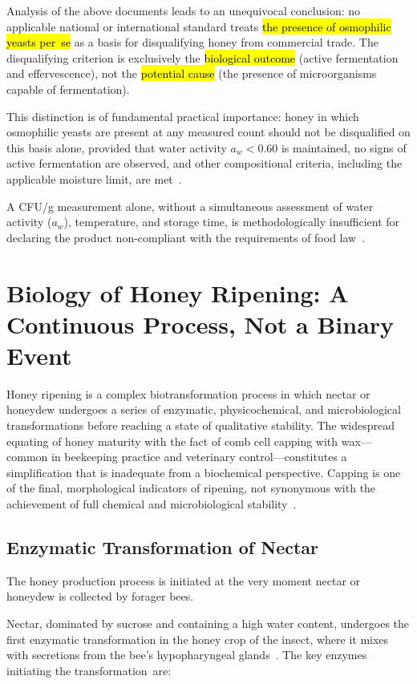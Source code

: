 \documentclass[foods,review,accept,pdftex,moreauthors]{Definitions/mdpi}
\begin{document}
Analysis of the above documents leads to an unequivocal conclusion:
no applicable national or international standard treats \hl{the
presence of osmophilic yeasts per~se} as a basis for disqualifying
honey from commercial trade. The disqualifying criterion is exclusively
the \hl{biological outcome} (active fermentation and effervescence),
not the \hl{potential cause} (the presence of microorganisms capable
of fermentation). 

{This distinction is of fundamental practical importance: honey in which osmophilic yeasts are present at any measured count should not be disqualified on this basis alone, provided that water activity $a_w < 0.60$ is maintained, no signs of active fermentation are observed, and other compositional criteria, including the applicable moisture limit, are met}~\cite{codex_stan12,eudir2001110}.

A CFU/g measurement alone, without a simultaneous assessment of water
activity ($a_w$), temperature, and storage time, is methodologically
insufficient for declaring the product non-compliant with the
requirements of food law~\cite{tsagkaris2021,schoder2026}.






\section{Biology of Honey Ripening: A Continuous Process, Not a Binary Event}

Honey ripening is a complex biotransformation process in which
nectar or honeydew undergoes a series of enzymatic, physicochemical,
and microbiological transformations before reaching a state of
qualitative stability. The widespread equating of honey maturity
with the fact of comb cell capping with wax---common in beekeeping
practice and veterinary control---constitutes a simplification that
is inadequate from a biochemical perspective. Capping is one of the
final, morphological indicators of ripening, not synonymous with the
achievement of full chemical and microbiological
stability~\cite{zhang2021,sun2021}.

\subsection{Enzymatic Transformation of Nectar}
The honey production process is initiated at the very moment nectar
or honeydew is collected by forager bees. 

Nectar, dominated by sucrose and containing a high water content, undergoes the first enzymatic transformation in the honey crop of the insect, where it mixes with secretions from the bee’s hypopharyngeal glands~\cite{biochemreactions2022}. The key enzymes initiating
the \mbox{transformation are:}
\end{document}
